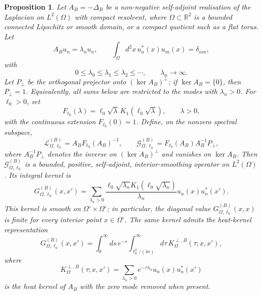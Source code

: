 \documentclass[openacc]{rsproca_new}%
\newtheorem{proposition}{\bf Proposition}[section]
\begin{document}
\begin{proposition}\label{prop:spectral-td-green}
Let $A_B=-\Delta_B$ be a non-negative self-adjoint realisation of the Laplacian on $L^2(\Omega)$ with compact resolvent, where $\Omega\subset\mathbb R^2$ is a bounded connected Lipschitz or smooth domain, or a compact quotient such as a flat torus. Let
\begin{equation}
  A_B u_n=\lambda_n u_n,
  \qquad
  \int_\Omega d^2x\,u_n^*(x)u_m(x)=\delta_{nm},
\end{equation}
with
\begin{equation}
  0\leq\lambda_0\leq\lambda_1\leq\lambda_2\leq\cdots,
  \qquad
  \lambda_n\to\infty.
\end{equation}
Let $P_\perp$ be the orthogonal projector onto $(\ker A_B)^\perp$; if $\ker A_B=\{0\}$, then $P_\perp=1$. Equivalently, all sums below are restricted to the modes with $\lambda_n>0$. For $\ell_0>0$, set
\begin{equation}
  F_{\ell_0}(\lambda)=\ell_0\sqrt{\lambda}\,K_1\!\left(\ell_0\sqrt{\lambda}\right),
  \qquad \lambda>0,
\end{equation}
with the continuous extension $F_{\ell_0}(0)=1$. Define, on the nonzero spectral subspace,
\begin{equation}
  \mathcal L_{\Omega,\ell_0}^{(B)}
  =A_B F_{\ell_0}(A_B)^{-1},
  \qquad
  \mathcal G_{\Omega,\ell_0}^{(B)}
  =F_{\ell_0}(A_B)A_B^{-1}P_\perp,
\end{equation}
where $A_B^{-1}P_\perp$ denotes the inverse on $(\ker A_B)^\perp$ and vanishes on $\ker A_B$. Then $\mathcal G_{\Omega,\ell_0}^{(B)}$ is a bounded, positive, self-adjoint, interior-smoothing operator on $L^2(\Omega)$. Its integral kernel is
\begin{equation}\label{GB}
  G_{\Omega,\ell_0}^{(B)}(x,x')
  =\sum_{\lambda_n>0}
  \frac{\ell_0\sqrt{\lambda_n}K_1\!\left(\ell_0\sqrt{\lambda_n}\right)}{\lambda_n}
  u_n(x)u_n^*(x').
\end{equation}
This kernel is smooth on $\Omega^\circ\times\Omega^\circ$; in particular, the diagonal value $G_{\Omega,\ell_0}^{(B)}(x,x)$ is finite for every interior point $x\in\Omega^\circ$. The same kernel admits the heat-kernel representation
\begin{equation}
  G_{\Omega,\ell_0}^{(B)}(x,x')
  =\int_0^\infty ds\,e^{-s}
  \int_{\ell_0^2/(4s)}^\infty d\tau\,
  K_\Omega^{\perp,B}(\tau;x,x'),
\end{equation}
where
\begin{equation}
  K_\Omega^{\perp,B}(\tau;x,x')
  =\sum_{\lambda_n>0}e^{-\tau\lambda_n}u_n(x)u_n^*(x')
\end{equation}
is the heat kernel of $A_B$ with the zero mode removed when present.
\end{proposition}
\end{document}
